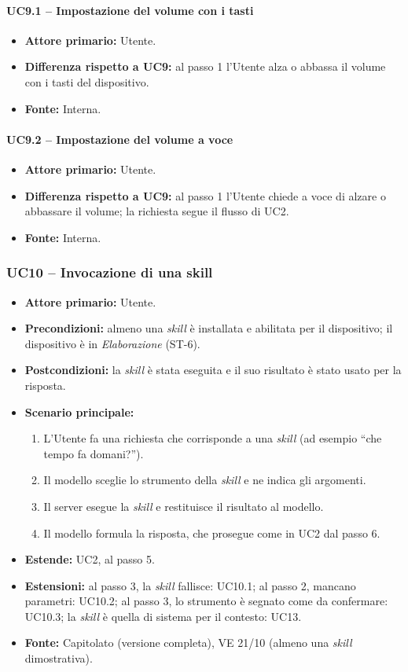 \documentclass[12pt,a4paper]{article}
\newcommand{\tightlist}{\setlength{\itemsep}{1pt}\setlength{\parskip}{0pt}}
\begin{document}
\paragraph{UC9.1 -- Impostazione del volume con i tasti}
\begin{itemize}
\tightlist
\item \textbf{Attore primario:} Utente.
\item \textbf{Differenza rispetto a UC9:} al passo 1 l'Utente alza o abbassa il volume con i tasti del dispositivo.
\item \textbf{Fonte:} Interna.
\end{itemize}

\paragraph{UC9.2 -- Impostazione del volume a voce}
\begin{itemize}
\tightlist
\item \textbf{Attore primario:} Utente.
\item \textbf{Differenza rispetto a UC9:} al passo 1 l'Utente chiede a voce di alzare o abbassare il volume; la richiesta segue il flusso di UC2.
\item \textbf{Fonte:} Interna.
\end{itemize}

\subsubsection{UC10 -- Invocazione di una skill}
\begin{itemize}
\tightlist
\item \textbf{Attore primario:} Utente.
\item \textbf{Precondizioni:} almeno una \emph{skill} è installata e abilitata per il dispositivo; il dispositivo è in \emph{Elaborazione} (ST-6).
\item \textbf{Postcondizioni:} la \emph{skill} è stata eseguita e il suo risultato è stato usato per la risposta.
\item \textbf{Scenario principale:}
\begin{enumerate}
\tightlist
\item L'Utente fa una richiesta che corrisponde a una \emph{skill} (ad esempio ``che tempo fa domani?'').
\item Il modello sceglie lo strumento della \emph{skill} e ne indica gli argomenti.
\item Il server esegue la \emph{skill} e restituisce il risultato al modello.
\item Il modello formula la risposta, che prosegue come in UC2 dal passo 6.
\end{enumerate}
\item \textbf{Estende:} UC2, al passo 5.
\item \textbf{Estensioni:} al passo 3, la \emph{skill} fallisce: UC10.1; al passo 2, mancano parametri: UC10.2; al passo 3, lo strumento è segnato come da confermare: UC10.3; la \emph{skill} è quella di sistema per il contesto: UC13.
\item \textbf{Fonte:} Capitolato (versione completa), VE 21/10 (almeno una \emph{skill} dimostrativa).
\end{itemize}
\end{document}
